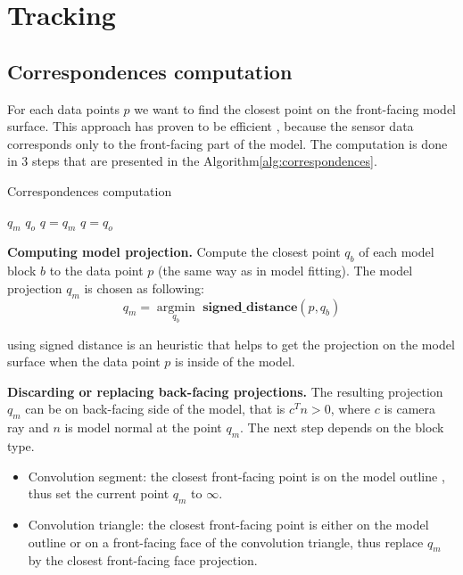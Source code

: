 \section{Tracking}

\subsection{Correspondences computation}

For each data points $p$ we want to find the closest point on the front-facing model surface. This approach has proven to be efficient  \cite{tagliasacchi2015robust}, because the sensor data corresponds only to the front-facing part of the model. The computation is done in 3 steps that are presented in the Algorithm\ref{alg:correspondences}.

\begin{algorithm}
\caption{Correspondences computation}
\begin{algorithmic}[1]
  		 \State {} $q_m$
  		  \State {}
  		  \State {} $q_o$
  		  	\State $q = q_m$
  		  \Else
  		  	\State $q = q_o$
  		  \EndIf
	\EndFor
\end{algorithmic}
\label{alg:correspondences}
\end{algorithm}

\textbf{Computing model projection.}
Compute the closest point $q_b$ of each model block $b$ to the data point $p$  (the same way as in model fitting). The model projection $q_m$ is chosen as following: 
\begin{equation*}
	q_m = \underset{q_b}{\operatorname{argmin}}{ \textbf{ signed\_distance}(p, q_b)} 
\end{equation*}

using signed distance is an heuristic that helps to get the projection on the model surface when the data point $p$ is inside of the model.

\textbf{Discarding or replacing back-facing projections.}
The resulting projection $q_m$ can be on back-facing side of the model, that is $c^{T} n > 0$, where $c$ is camera ray and $n$ is model normal at the point $q_m$.
The next step depends on the block type. 
\begin{itemize}
	\item Convolution segment: the closest front-facing point is on the model outline , thus set the current point $q_m$ to $\infty$.
	\item Convolution triangle: the closest front-facing point is either on the model outline or on a front-facing face of the convolution triangle, thus replace $q_m$ by the closest front-facing face projection.
\end{itemize}

